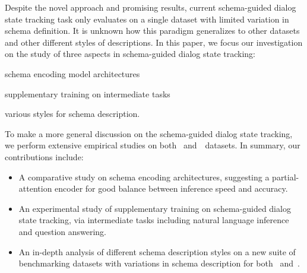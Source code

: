 Despite the novel approach and promising results, current
schema-guided dialog state tracking task only evaluates on a single
dataset with limited variation in schema definition. It is unknown how
this paradigm generalizes to other datasets and other different styles
of descriptions. In this paper, we focus our investigation on the
study of three aspects in schema-guided dialog state tracking:
\begin{inparaenum}[(1)]
\item schema encoding model architectures
\item supplementary training on intermediate tasks
\item various styles for schema description.
\end{inparaenum}
To make a more general discussion on
the schema-guided dialog state tracking, we perform extensive
empirical studies on both \sgdst~and~\multiwoz~datasets. In summary,
our contributions include:
\begin{itemize}
\item A comparative study
  on schema encoding architectures, suggesting a partial-attention
  encoder for good balance between inference speed and accuracy.
\item An experimental study of supplementary training on
  schema-guided dialog state tracking, via intermediate tasks
  including natural language inference and question answering.
\item An in-depth analysis of different schema description styles on a new
  suite of benchmarking datasets with
  variations in schema description for both \sgdst~and~\multiwoz.
\end{itemize}















